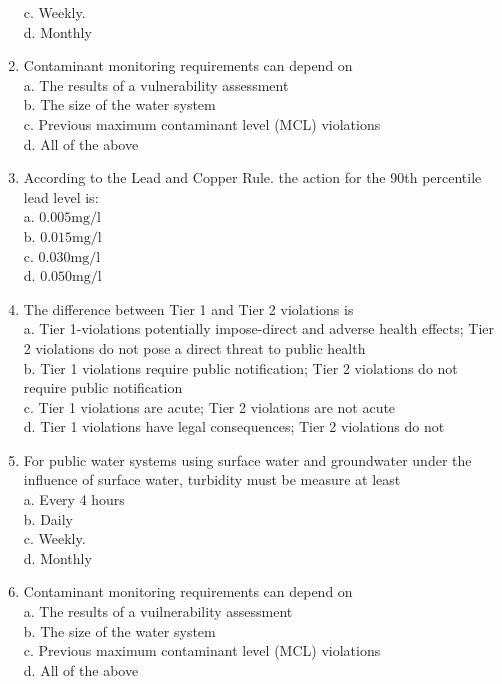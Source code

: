\begin{enumerate}
c. Weekly.\\
d. Monthly\\
\item Contaminant monitoring requirements can depend on\\
a. The results of a vulnerability assessment\\
b. The size of the water system\\
c. Previous maximum contaminant level (MCL) violations\\
d. All of the above\\
\item According to the Lead and Copper Rule. the action for the 90th percentile lead level is:\\
a. $0.005 \mathrm{mg} / \mathrm{l}$\\
b. $0.015 \mathrm{mg} / \mathrm{l}$\\
c. $0.030 \mathrm{mg} / \mathrm{l}$\\
d. $0.050 \mathrm{mg} / \mathrm{l}$\\
\item The difference between Tier 1 and Tier 2 violations is\\
a. Tier 1-violations potentially impose-direct and adverse health effects; Tier 2 violations do not pose a direct threat to public health\\
b. Tier 1 violations require public notification; Tier 2 violations do not require public notification\\
c. Tier 1 violations are acute; Tier 2 violations are not acute\\
d. Tier 1 violations have legal consequences; Tier 2 violations do not\\
\item For public water systems using surface water and groundwater under the influence of surface water, turbidity must be measure at least\\
a. Every 4 hours\\
b. Daily\\
c. Weekly.\\
d. Monthly\\
\item Contaminant monitoring requirements can depend on\\
a. The results of a vuilnerability assessment\\
b. The size of the water system\\
c. Previous maximum contaminant level (MCL) violations\\
d. All of the above\\

\end{enumerate}
